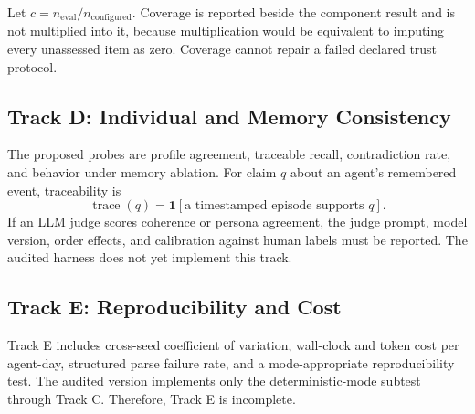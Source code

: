 \documentclass[letterpaper]{article}
\begin{document}
Let $c=n_{\mathrm{eval}}/n_{\mathrm{configured}}$. Coverage is reported beside the component result and
is not multiplied into it, because multiplication would be equivalent to imputing every unassessed item
as zero. Coverage cannot repair a failed declared trust protocol.

\subsection{Track D: Individual and Memory Consistency}

The proposed probes are profile agreement, traceable recall, contradiction rate, and behavior under
memory ablation. For claim $q$ about an agent's remembered event, traceability is
\begin{equation}
\operatorname{trace}(q)=\mathbf{1}[\text{a timestamped episode supports }q].
\end{equation}
If an LLM judge scores coherence or persona agreement, the judge prompt, model version, order effects,
and calibration against human labels must be reported. The audited harness does not yet implement this
track.

\subsection{Track E: Reproducibility and Cost}

Track E includes cross-seed coefficient of variation, wall-clock and token cost per agent-day, structured
parse failure rate, and a mode-appropriate reproducibility test. The audited version implements only the
deterministic-mode subtest through Track C. Therefore, Track E is incomplete.
\end{document}
